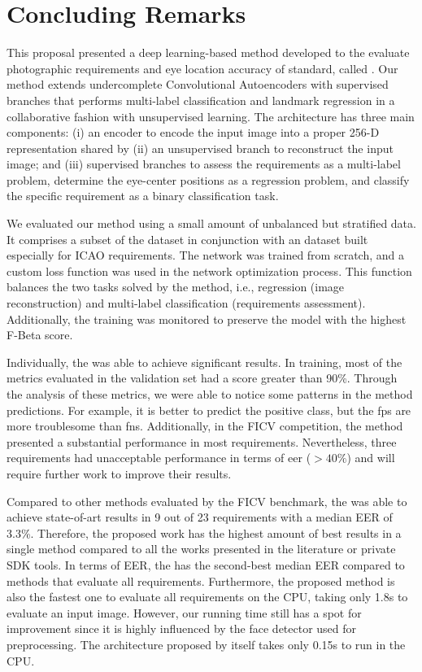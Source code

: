 \section{Concluding Remarks}

This proposal presented a deep learning-based method developed to the evaluate photographic requirements and eye location accuracy of \icao standard, called \methodname. Our method extends undercomplete Convolutional Autoencoders with supervised branches that performs multi-label classification and landmark regression in a collaborative fashion with unsupervised learning. The architecture has three main components: (i) an encoder to encode the input image into a proper 256-D representation shared by (ii) an unsupervised branch to reconstruct the input image; and (iii) supervised branches to assess the requirements as a multi-label problem, determine the eye-center positions as a regression problem, and classify the specific \pixelation requirement as a binary classification task.

We evaluated our method using a small amount of unbalanced but stratified data. It comprises a subset of the \ficvtest dataset in conjunction with an \adhoc dataset built especially for ICAO requirements. The network was trained from scratch, and a custom loss function was used in the network optimization process. This function balances the two tasks solved by the method, i.e., regression (image reconstruction) and multi-label classification (requirements assessment). Additionally, the training was monitored to preserve the model with the highest F-Beta score.

Individually, the \methodname was able to achieve significant results. In training, most of the metrics evaluated in the validation set had a score greater than 90\%. Through the analysis of these metrics, we were able to notice some patterns in the method predictions. For example, it is better to predict the positive class, but the \aclp{fp} are more troublesome than \aclp{fn}. Additionally, in the FICV competition, the method presented a substantial performance in most requirements. Nevertheless, three requirements had unacceptable performance in terms of \acs{eer} ($> 40\%$) and will require further work to improve their results.

Compared to other methods evaluated by the FICV benchmark, the \methodname was able to achieve state-of-art results in 9 out of 23 requirements with a median EER of 3.3\%. Therefore, the proposed work has the highest amount of best results in a single method compared to all the works presented in the literature or private SDK tools. In terms of EER, the \methodname has the second-best median EER compared to methods that evaluate all requirements. Furthermore, the proposed method is also the fastest one to evaluate all requirements on the CPU, taking only 1.8s to evaluate an input image. However, our running time still has a spot for improvement since it is highly influenced by the face detector used for preprocessing. The architecture proposed by itself takes only 0.15s to run in the CPU.

